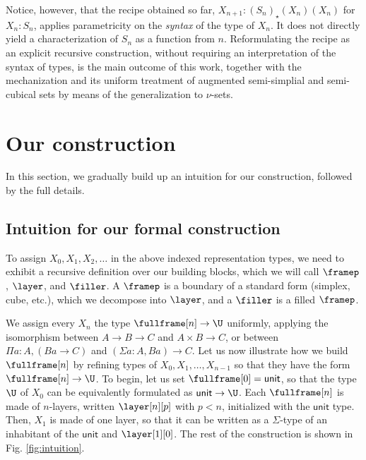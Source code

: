 \documentclass[10pt]{art.cls/art}
\newcommand{\unittype}{\ensuremath{\mathsf{unit}}}
\newcommand{\kstar}{{\star}}
\begin{document}
Notice, however, that the recipe obtained so far, $X_{n + 1}: ({S_n})_\kstar(X_n)(X_n)$ for $X_n: S_n$, applies parametricity on the \emph{syntax} of the type of $X_n$. It does not directly yield a characterization of $S_n$ as a function from $n$. Reformulating the recipe as an explicit recursive construction, without requiring an interpretation of the syntax of types, is the main outcome of this work, together with the mechanization and its uniform treatment of augmented semi-simplial and semi-cubical sets by means of the generalization to $\nu$-sets.

\section{Our construction}
In this section, we gradually build up an intuition for our construction, followed by the full details.

\subsection{Intuition for our formal construction}
To assign $X_0, X_1, X_2, \ldots$ in the above indexed representation types, we need to exhibit a recursive definition over our building blocks, which we will call $\framep$, $\layer$, and $\filler$. A $\framep$ is a boundary of a standard form (simplex, cube, etc.), which we decompose into $\layer$, and a $\filler$ is a filled $\framep$.

We assign every $X_n$ the type $\fullframe[n] \rightarrow \U$ uniformly, applying the isomorphism between $A \rightarrow B \rightarrow C$ and $A \times B \rightarrow C$, or between $\Pi a : A, (B a \rightarrow C)$ and $(\Sigma a : A, B a) \rightarrow C$. Let us now illustrate how we build $\fullframe[n]$ by refining types of $X_0, X_1, \ldots, X_{n - 1}$ so that they have the form $\fullframe[n] \rightarrow \U$. To begin, let us set $\fullframe[0] = \unittype$, so that the type $\U$ of $X_0$ can be equivalently formulated as $\unittype \rightarrow \U$. Each $\fullframe[n]$ is made of $n$-layers, written $\layer[n][p]$ with $p < n$, initialized with the $\unittype$ type. Then, $X_1$ is made of one layer, so that it can be written as a $\Sigma$-type of an inhabitant of the $\unittype$ and $\layer[1][0]$. The rest of the construction is shown in Fig. \ref{fig:intuition}.
\end{document}
